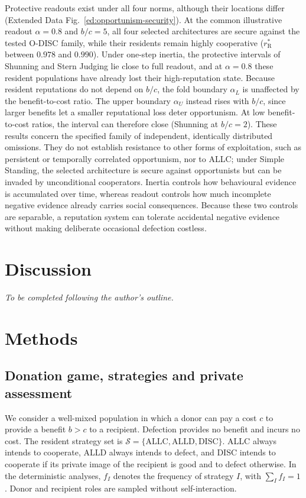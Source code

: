 \documentclass[fleqn,10pt]{article}
\begin{document}
Protective readouts exist under all four norms, although their locations differ (Extended Data Fig.~\ref{ed:opportunism-security}). At the common illustrative readout $\alpha=0.8$ and $b/c=5$, all four selected architectures are secure against the tested O-DISC family, while their residents remain highly cooperative ($r_{\mathrm R}^*$ between $0.978$ and $0.990$). Under one-step inertia, the protective intervals of Shunning and Stern Judging lie close to full readout, and at $\alpha=0.8$ these resident populations have already lost their high-reputation state. Because resident reputations do not depend on $b/c$, the fold boundary $\alpha_L$ is unaffected by the benefit-to-cost ratio. The upper boundary $\alpha_U$ instead rises with $b/c$, since larger benefits let a smaller reputational loss deter opportunism. At low benefit-to-cost ratios, the interval can therefore close (Shunning at $b/c=2$). These results concern the specified family of independent, identically distributed omissions. They do not establish resistance to other forms of exploitation, such as persistent or temporally correlated opportunism, nor to ALLC; under Simple Standing, the selected architecture is secure against opportunists but can be invaded by unconditional cooperators. Inertia controls how behavioural evidence is accumulated over time, whereas readout controls how much incomplete negative evidence already carries social consequences. Because these two controls are separable, a reputation system can tolerate accidental negative evidence without making deliberate occasional defection costless.
\section*{Discussion}
\textit{To be completed following the author's outline.}
\section*{Methods}
\label{sec:methods}

\subsection*{Donation game, strategies and private assessment}

We consider a well-mixed population in which a donor can pay a cost $c$ to provide a benefit $b>c$ to a recipient. Defection provides no benefit and incurs no cost. The resident strategy set is $\mathcal S=\{\mathrm{ALLC},\mathrm{ALLD},\mathrm{DISC}\}$. ALLC always intends to cooperate, ALLD always intends to defect, and DISC intends to cooperate if its private image of the recipient is good and to defect otherwise. In the deterministic analyses, $f_I$ denotes the frequency of strategy $I$, with $\sum_I f_I=1$. Donor and recipient roles are sampled without self-interaction.
\end{document}
